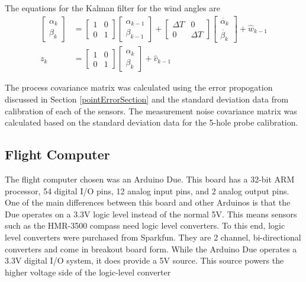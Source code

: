\documentclass[]{aiaa-tc}%
\begin{document}
The equations for the Kalman filter for the wind angles are
\begin{align}
\begin{bmatrix}
\alpha_k\\\beta_k
\end{bmatrix} &= \begin{bmatrix}
1& 0\\0&1
\end{bmatrix}\begin{bmatrix}
\alpha_{k-1}\\\beta_{k-1}
\end{bmatrix}+\begin{bmatrix}
\Delta T& 0\\0&\Delta T
\end{bmatrix}\begin{bmatrix}
\dot{\alpha_{k}}\\\dot{\beta_{k}}
\end{bmatrix}+\hat{w}_{k-1}\\
z_k & = \begin{bmatrix}
1 & 0\\0&1
\end{bmatrix}\begin{bmatrix}
\alpha_{k}\\
\beta_{k}
\end{bmatrix}+\hat{v}_{k-1}
\end{align}

The process covariance matrix was calculated using the error propogation discussed in Section \ref{pointErrorSection} and the standard deviation data from calibration of each of the sensors. The measurement noise covariance matrix was calculated based on the standard deviation data for the 5-hole probe calibration.

\subsection*{Flight Computer}
The flight computer chosen was an Arduino Due. This board has a 32-bit ARM processor, 54 digital I/O pins, 12 analog input pins, and 2 analog output pins. 
One of the main differences between this board and other Arduinos is that the Due operates on a 3.3V logic level instead of the normal 5V. This means sensors such as the HMR-3500 compass need logic level converters. To this end, logic level converters were purchased from Sparkfun. They are 2 channel, bi-directional converters and come in breakout board form. While the Arduino Due operates a 3.3V digital I/O system, it does provide a 5V source. This source powers the higher voltage side of the logic-level converter
\end{document}
